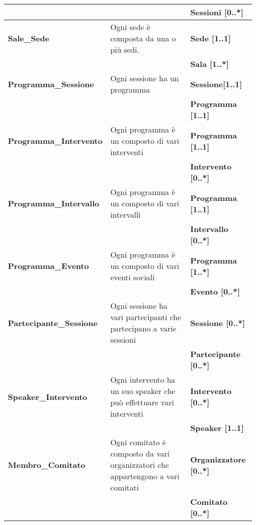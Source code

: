 \begin{longtable}{|p{}|p{}|p{}|}
	& & \textbf{Sessioni [0..*]} \\ \hline
	\textbf{Sale\_Sede} & Ogni sede è composta da una o più sedi. & \textbf{Sede [1..1]} \\
	& & \textbf{Sala [1..*]} \\ \hline
	\textbf{Programma\_Sessione} & Ogni sessione ha un programma & \textbf{Sessione[1..1]} \\
	& & \textbf{Programma [1..1]} \\ \hline
	\textbf{Programma\_Intervento} & Ogni programma è un composto di vari interventi & \textbf{Programma [1..1]} \\
	& & \textbf{Intervento [0..*]} \\ \hline
	\textbf{Programma\_Intervallo} & Ogni programma è un composto di vari intervalli & \textbf{Programma [1..1]} \\
	& & \textbf{Intervallo [0..*]} \\ \hline
	\textbf{Programma\_Evento} & Ogni programma è un composto di vari eventi sociali & \textbf{Programma [1..*]} \\
	& & \textbf{Evento [0..*]} \\ \hline
	\textbf{Partecipante\_Sessione} & Ogni sessione ha vari partecipanti che partecipano a varie sessioni & \textbf{Sessione [0..*]}\\
	& & \textbf{Partecipante [0..*]} \\ \hline
	\textbf{Speaker\_Intervento} & Ogni intervento ha un suo speaker che può effettuare vari interventi & \textbf{Intervento [0..*]}\\
	& & \textbf{Speaker [1..1]} \\ \hline
	\textbf{Membro\_Comitato} & Ogni comitato è composto da vari organizzatori che appartengono a vari comitati & \textbf{Organizzatore [0..*]} \\ & & \textbf{Comitato [0..*]} \\
	\hline
\end{longtable}